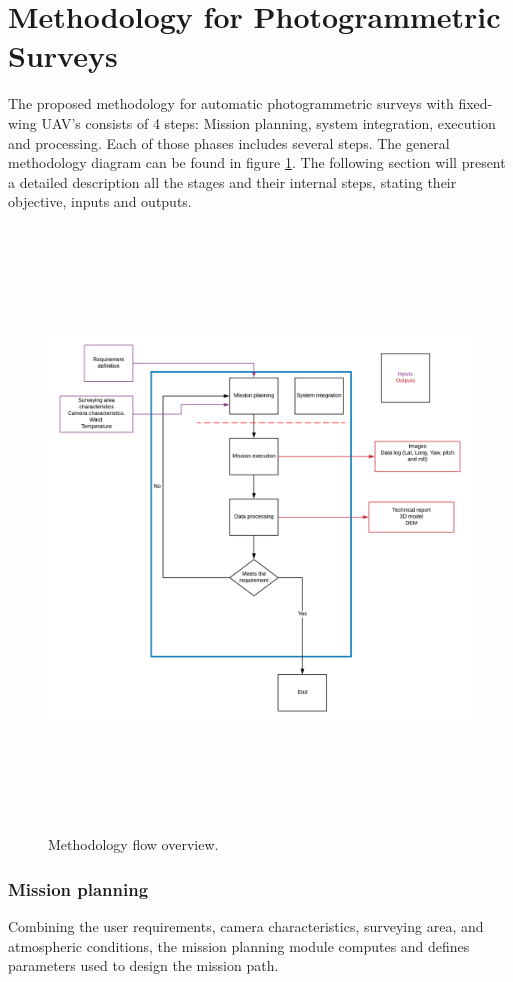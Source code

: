 \section{Methodology for Photogrammetric Surveys}
The proposed methodology for automatic photogrammetric surveys with fixed-wing UAV's consists of 4 steps: Mission planning, system integration, execution and processing. Each of those phases includes several steps. The general methodology diagram can be found in figure \ref{fig:methodology_Flow}.
The following section will present a detailed description all the stages and their internal steps, stating their objective, inputs and outputs.
\begin{figure}[H]
\centering
\includegraphics[width=16cm,height=16cm,keepaspectratio]{imagenes/Methodology.png}
\caption{Methodology flow overview.}
\label{fig:methodology_Flow}
\end{figure}


\subsubsection{Mission planning}
Combining the user requirements, camera characteristics, surveying area, and atmospheric conditions, the mission planning module computes and defines parameters used to design the mission path.


